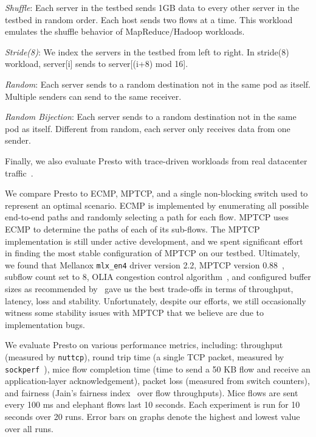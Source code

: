 {\em Shuffle}: Each server in the testbed sends 1GB data to every other server in the testbed in random order. 
Each host sends two flows at a time. %
This workload emulates the shuffle behavior of MapReduce/Hadoop workloads.

{\em Stride(8)}: We index the servers in the testbed from left to right. In stride(8) workload, server[i] sends to server[(i+8) mod 16].

{\em Random}: Each server sends to a random destination 
 not in the same pod as itself. Multiple senders can send to the same receiver.

{\em Random Bijection}: Each server sends to a random destination not in the same pod as itself. 
Different from random, each server only receives data from one sender.
 
Finally, we also evaluate Presto with trace-driven workloads from real datacenter traffic~\cite{kandula2009nature}.

We compare Presto to ECMP, MPTCP, and a 
single non-blocking switch used to represent an optimal scenario.
ECMP is implemented by enumerating all possible end-to-end paths and randomly selecting a path for each flow.
MPTCP uses ECMP to determine the paths of each of its sub-flows.
The MPTCP implementation is still under active development, and
we spent significant effort in finding the most stable configuration of MPTCP on our testbed. Ultimately, we found that Mellanox {\tt mlx\_en4} driver version
2.2, MPTCP version 0.88~\cite{mptcp-linux}, subflow count set to 8, OLIA congestion control algorithm~\cite{mptcp-not-optimal}, and configured buffer sizes
as recommended by~\cite{dc-mptcp,mptcp-not-optimal,paasch2013benefits} gave us the best trade-offs in terms of throughput, latency, loss and stability.
Unfortunately, despite our efforts, we still occasionally witness some stability issues 
with MPTCP that we believe are due to implementation bugs.

We evaluate Presto on various performance metrics, including: 
throughput (measured by {\tt nuttcp}), round trip time (a single TCP packet, measured by {\tt sockperf}~\cite{sockperf}), 
mice flow completion time (time to send a 50 KB flow and receive an application-layer acknowledgement), packet loss (measured from switch counters), 
and fairness (Jain's fairness index~\cite{jain-fair} over flow throughputs).  Mice flows are sent every 100 ms and elephant flows last 10 seconds. 
Each experiment is run for 10 seconds over 20 runs. Error bars on graphs denote
the highest and lowest value over all runs.

